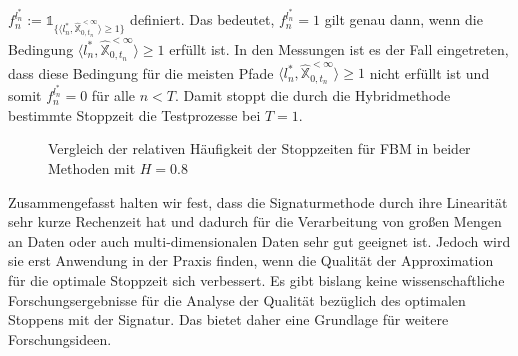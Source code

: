 \documentclass[12pt,titlepage,headsepline]{article}
\begin{document}
      $f_n^{l_n^*} := \mathds{1}_{ \{ \langle l_n^*, \hat{\mathbb{X}}^{< \infty}_{0,t_n}  \rangle \geq 1 \} }$ definiert. Das bedeutet, $f_n^{l_n^*}=1$ gilt genau dann, wenn die Bedingung $\langle l_n^*, \hat{\mathbb{X}}^{< \infty}_{0,t_n}  \rangle \geq 1$ erfüllt ist. In den Messungen ist es der Fall eingetreten, dass diese Bedingung für die meisten Pfade
      $\langle l_n^*, \hat{\mathbb{X}}^{< \infty}_{0,t_n}  \rangle \geq 1$ nicht erfüllt ist und somit $f_n^{l_n^*}=0$ für alle $n<T$. Damit stoppt die durch die Hybridmethode bestimmte Stoppzeit die Testprozesse bei $T=1$.
      \begin{figure}[H]
        \caption{Vergleich der relativen Häufigkeit der Stoppzeiten für FBM in beider Methoden mit $H=0.8$}
        \label{verteilung_vergleich_0_8}
      \end{figure}
      \hfill\break
      Zusammengefasst halten wir fest, dass die Signaturmethode durch ihre Linearität sehr kurze Rechenzeit hat und dadurch für die Verarbeitung von großen Mengen an Daten oder auch multi-dimensionalen Daten sehr gut geeignet ist. Jedoch wird sie erst Anwendung in der Praxis finden, wenn die Qualität der Approximation für die optimale Stoppzeit sich verbessert. Es gibt bislang keine wissenschaftliche Forschungsergebnisse für die Analyse der Qualität bezüglich des optimalen Stoppens mit der Signatur. Das bietet daher eine Grundlage für weitere Forschungsideen.
      \hfill\break
\end{document}
